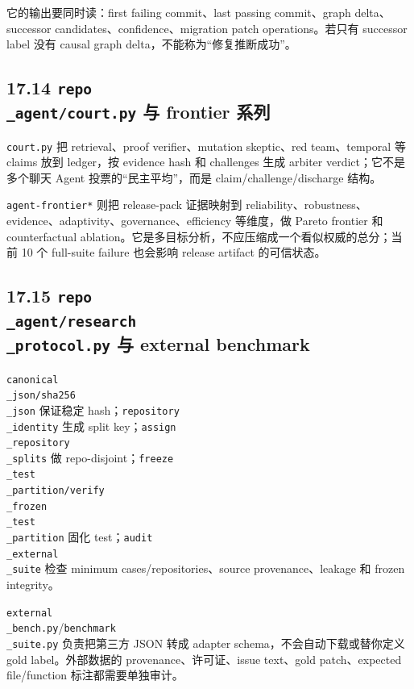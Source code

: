 \documentclass[UTF8,12pt,openany]{ctexbook}
\begin{document}
它的输出要同时读：first failing commit、last passing commit、graph delta、successor candidates、confidence、migration patch operations。若只有 successor label 没有 causal graph delta，不能称为“修复推断成功”。\par

\subsection{17.14 \texttt{repo\\_agent/court.py} 与 frontier 系列}

\texttt{court.py} 把 retrieval、proof verifier、mutation skeptic、red team、temporal 等 claims 放到 ledger，按 evidence hash 和 challenges 生成 arbiter verdict；它不是多个聊天 Agent 投票的“民主平均”，而是 claim/challenge/discharge 结构。\par

\texttt{agent-frontier*} 则把 release-pack 证据映射到 reliability、robustness、evidence、adaptivity、governance、efficiency 等维度，做 Pareto frontier 和 counterfactual ablation。它是多目标分析，不应压缩成一个看似权威的总分；当前 10 个 full-suite failure 也会影响 release artifact 的可信状态。\par

\subsection{17.15 \texttt{repo\\_agent/research\\_protocol.py} 与 external benchmark}

\texttt{canonical\\_json/sha256\\_json} 保证稳定 hash；\texttt{repository\\_identity} 生成 split key；\texttt{assign\\_repository\\_splits} 做 repo-disjoint；\texttt{freeze\\_test\\_partition/verify\\_frozen\\_test\\_partition} 固化 test；\texttt{audit\\_external\\_suite} 检查 minimum cases/repositories、source provenance、leakage 和 frozen integrity。\par

\texttt{external\\_bench.py}/\texttt{benchmark\\_suite.py} 负责把第三方 JSON 转成 adapter schema，不会自动下载或替你定义 gold label。外部数据的 provenance、许可证、issue text、gold patch、expected file/function 标注都需要单独审计。\par
\end{document}
